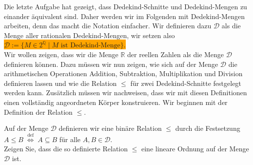Die letzte Aufgabe hat gezeigt, dass Dedekind-Schnitte und Dedekind-Mengen zu einander \"aquivalent
sind.  Daher werden wir im Folgenden mit Dedekind-Mengen
arbeiten,  denn das macht die Notation einfacher.  Wir definieren dazu
$\mathcal{D}$ als die Menge aller rationalen Dedekind-Mengen, wir setzen also
\\[0.2cm]
\hspace*{1.3cm}
\colorbox{orange}{
$\mathcal{D} := \bigl\{ M \in 2^{\mathbb{Q}} \mid \mbox{$M$ ist Dedekind-Menge} \bigr\}$.}
\\[0.2cm]
Wir wollen zeigen, dass wir die Menge $\mathbb{R}$ der reellen Zahlen als die Menge $\mathcal{D}$
definieren k\"onnen.  Dazu m\"ussen wir nun zeigen, wie sich auf der Menge $\mathcal{D}$ die
arithmetischen Operationen Addition, Subtraktion, Multiplikation und Division definieren 
lassen und wie die Relation $\leq$ f\"ur zwei Dedekind-Schnitte festgelegt
werden kann.  Zus\"atzlich m\"ussen wir nachweisen, dass wir mit diesen Definitionen einen vollst\"andig
angeordneten K\"orper konstruieren.  Wir beginnen mit der Definition der Relation $\leq$.

\exercise
Auf der Menge $\mathcal{D}$ definieren wir eine bin\"are Relation $\leq$ durch die Festsetzung
\\[0.2cm]
\hspace*{1.3cm}
$A \leq B \;\stackrel{\mathrm{def}}{\Longleftrightarrow}\; A \subseteq B$ \quad f\"ur alle $A,B \in \mathcal{D}$.
\\[0.2cm]
Zeigen Sie, dass die so definierte Relation $\leq$ eine lineare Ordnung auf der Menge $\mathcal{D}$ ist.
\pagebreak

